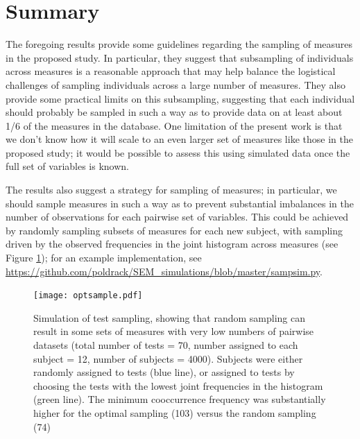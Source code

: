 \documentclass[11pt, oneside]{article}   	%
\begin{document}
\section{Summary}
The foregoing results provide some guidelines regarding the sampling of measures in the proposed study.  In particular, they suggest that subsampling of individuals across measures is a reasonable approach that may help balance the logistical challenges of sampling individuals across a large number of measures.  They also provide some practical limits on this subsampling, suggesting that each individual should probably be sampled in such a way as to provide data on at least about 1/6 of the measures in the database.  One limitation of the present work is that we don't know how it will scale to an even larger set of measures like those in the proposed study; it would be possible to assess this using simulated data once the full set of variables is known.

The results also suggest a strategy for sampling of measures; in particular, we should sample measures in such a way as to prevent substantial imbalances in the number of observations for each pairwise set of variables.  This could be achieved by randomly sampling subsets of measures for each new subject, with sampling driven by the observed frequencies in the joint histogram across measures (see Figure \ref{fig:sampling}); for an example implementation, see \url{https://github.com/poldrack/SEM_simulations/blob/master/sampsim.py}.

\begin{figure}[!h]
\caption{Simulation of test sampling, showing that random sampling can result in some sets of measures with very low numbers of pairwise datasets (total number of tests = 70, number assigned to each subject = 12, number of subjects = 4000).  Subjects were either randomly assigned to tests (blue line), or assigned to tests by choosing the tests with the lowest joint frequencies in the histogram (green line).  The minimum cooccurrence frequency was substantially higher for the optimal sampling (103) versus the random sampling (74)}
\centering
\texttt{[image: optsample.pdf]}
\label{fig:sampling}
\end{figure}

\end{document}
